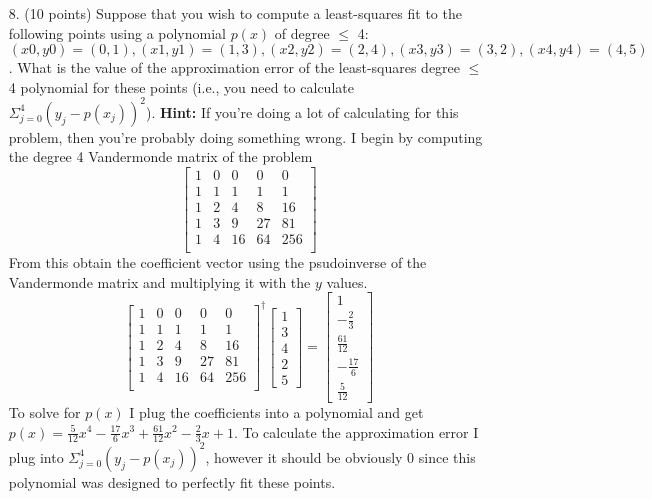 \documentclass{article}
\begin{document}
\begin{enumerate}
    \newpage
    \item[8.] (10 points) Suppose that you wish to compute a least-squares fit to the following points using a polynomial $p(x)$ of degree $\leq$ 4: $(x0, y0) = (0, 1),(x1, y1) = (1, 3),(x2, y2) = (2, 4),(x3, y3) = (3, 2),(x4, y4) = (4, 5)$.\newline
    What is the value of the approximation error of the least-squares degree $\leq$ 4 polynomial for these points (i.e., you need to calculate $\Sigma^4_{j=0}(y_j-p(x_j))^2$).
    \textbf{Hint: } If you’re doing a lot of calculating for this problem, then you’re probably doing something wrong.
    \newline
    \newline
    I begin by computing the degree 4 Vandermonde matrix of the problem
    \[\begin{bmatrix}
        1 & 0 & 0 & 0 & 0 \\
        1 & 1 & 1 & 1 & 1 \\
        1 & 2 & 4 & 8 & 16 \\
        1 & 3 & 9 & 27 & 81 \\
        1 & 4 & 16 & 64 & 256 \\
    \end{bmatrix}\]
    From this obtain the coefficient vector using the psudoinverse of the Vandermonde matrix and multiplying it with the $y$ values.
    \[\begin{bmatrix}
        1 & 0 & 0 & 0 & 0 \\
        1 & 1 & 1 & 1 & 1\\
        1 & 2 & 4 & 8 & 16\\
        1 & 3 & 9 & 27 & 81\\
        1 & 4 & 16 & 64 & 256\\
    \end{bmatrix}^\dagger
    \begin{bmatrix}
        1 \\ 3 \\ 4 \\ 2 \\ 5
    \end{bmatrix} = 
    \begin{bmatrix}
        1 \\ -\frac{2}{3} \\ \frac{61}{12} \\ -\frac{17}{6} \\ \frac{5}{12}
    \end{bmatrix}\]
    To solve for $p(x)$ I plug the coefficients into a polynomial and get $p(x)=\frac{5}{12}x^4-\frac{17}{6}x^3+\frac{61}{12}x^2-\frac{2}{3}x+1$. To calculate the approximation error I plug into $\Sigma^4_{j=0}(y_j-p(x_j))^2$, however it should be obviously 0 since this polynomial was designed to perfectly fit these points.

\end{enumerate}
\end{document}
